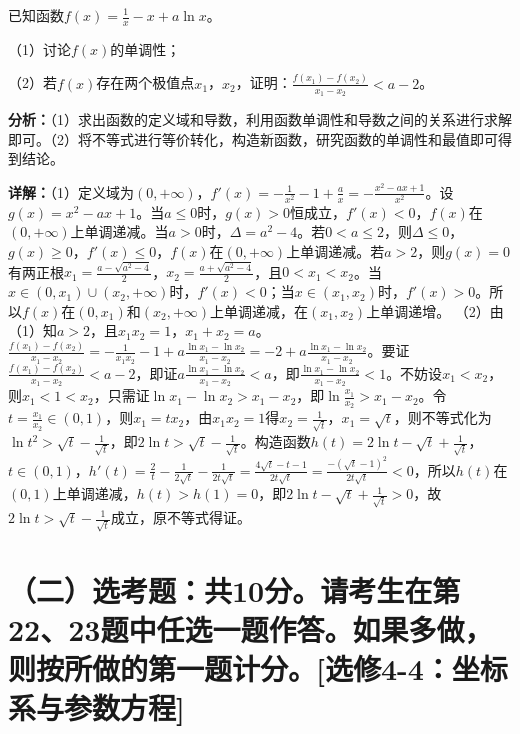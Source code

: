 \begin{question}[points=12]
已知函数$f(x)=\frac{1}{x}-x+a\ln x$。

（1）讨论$f(x)$的单调性；

（2）若$f(x)$存在两个极值点$x_1$，$x_2$，证明：$\frac{f(x_1)-f(x_2)}{x_1-x_2}<a-2$。
\begin{solution}

\textbf{分析：}（1）求出函数的定义域和导数，利用函数单调性和导数之间的关系进行求解即可。（2）将不等式进行等价转化，构造新函数，研究函数的单调性和最值即可得到结论。

\textbf{详解：}（1）定义域为$(0,+\infty)$，$f'(x)=-\frac{1}{x^2}-1+\frac{a}{x}=-\frac{x^2-ax+1}{x^2}$。设$g(x)=x^2-ax+1$。当$a\leq0$时，$g(x)>0$恒成立，$f'(x)<0$，$f(x)$在$(0,+\infty)$上单调递减。当$a>0$时，$\Delta=a^2-4$。若$0<a\leq2$，则$\Delta\leq0$，$g(x)\geq0$，$f'(x)\leq0$，$f(x)$在$(0,+\infty)$上单调递减。若$a>2$，则$g(x)=0$有两正根$x_1=\frac{a-\sqrt{a^2-4}}{2}$，$x_2=\frac{a+\sqrt{a^2-4}}{2}$，且$0<x_1<x_2$。当$x\in(0,x_1)\cup(x_2,+\infty)$时，$f'(x)<0$；当$x\in(x_1,x_2)$时，$f'(x)>0$。所以$f(x)$在$(0,x_1)$和$(x_2,+\infty)$上单调递减，在$(x_1,x_2)$上单调递增。
（2）由（1）知$a>2$，且$x_1x_2=1$，$x_1+x_2=a$。$\frac{f(x_1)-f(x_2)}{x_1-x_2}=-\frac{1}{x_1x_2}-1+a\frac{\ln x_1-\ln x_2}{x_1-x_2}=-2+a\frac{\ln x_1-\ln x_2}{x_1-x_2}$。要证$\frac{f(x_1)-f(x_2)}{x_1-x_2}<a-2$，即证$a\frac{\ln x_1-\ln x_2}{x_1-x_2}<a$，即$\frac{\ln x_1-\ln x_2}{x_1-x_2}<1$。不妨设$x_1<x_2$，则$x_1<1<x_2$，只需证$\ln x_1-\ln x_2>x_1-x_2$，即$\ln\frac{x_1}{x_2}>x_1-x_2$。令$t=\frac{x_1}{x_2}\in(0,1)$，则$x_1=tx_2$，由$x_1x_2=1$得$x_2=\frac{1}{\sqrt{t}}$，$x_1=\sqrt{t}$，则不等式化为$\ln t^2>\sqrt{t}-\frac{1}{\sqrt{t}}$，即$2\ln t>\sqrt{t}-\frac{1}{\sqrt{t}}$。构造函数$h(t)=2\ln t-\sqrt{t}+\frac{1}{\sqrt{t}}$，$t\in(0,1)$，$h'(t)=\frac{2}{t}-\frac{1}{2\sqrt{t}}-\frac{1}{2t\sqrt{t}}=\frac{4\sqrt{t}-t-1}{2t\sqrt{t}}=\frac{-(\sqrt{t}-1)^2}{2t\sqrt{t}}<0$，所以$h(t)$在$(0,1)$上单调递减，$h(t)>h(1)=0$，即$2\ln t-\sqrt{t}+\frac{1}{\sqrt{t}}>0$，故$2\ln t>\sqrt{t}-\frac{1}{\sqrt{t}}$成立，原不等式得证。
\end{solution}
\end{question}

\section*{（二）选考题：共10分。请考生在第22、23题中任选一题作答。如果多做，则按所做的第一题计分。[选修4-4：坐标系与参数方程]}

